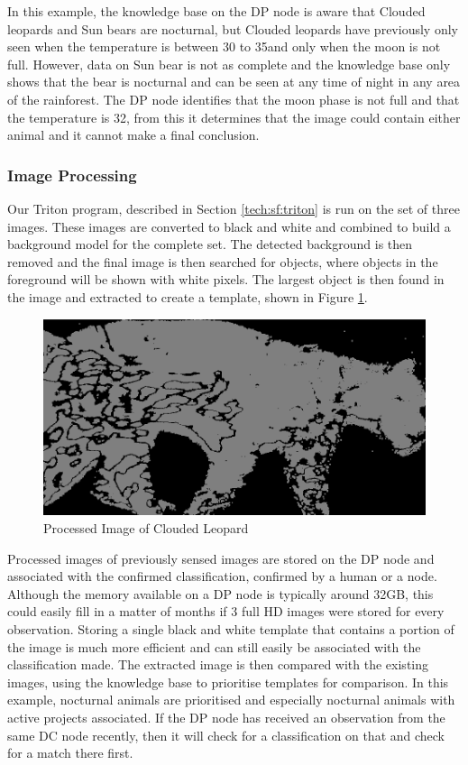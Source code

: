 			In this example, the knowledge base on the DP node is aware that Clouded leopards and Sun bears are nocturnal, but Clouded leopards have previously only seen when the temperature is between 30 to 35\celsius and only when the moon is not full. However, data on Sun bear is not as complete and the knowledge base only shows that the bear is nocturnal and can be seen at any time of night in any area of the rainforest. The DP node identifies that the moon phase is not full and that the temperature is 32\celsius, from this it determines that the image could contain either animal and it cannot make a final conclusion.
			
		\subsubsection{Image Processing}
			Our Triton program, described in Section \ref{tech:sf:triton} is run on the set of three images. These images are converted to black and white and combined to build a background model for the complete set. The detected background is then removed and the final image is then searched for objects, where objects in the foreground will be shown with white pixels. The largest object is then found in the image and extracted to create a template, shown in Figure \ref{clproc}.
			
			\begin{figure}[!t]
			\centering
			\includegraphics[width=\textwidth]{Chap4/figures/leopard_proc}
			\caption{Processed Image of Clouded Leopard}
			\label{clproc}
			\end{figure}
			
			Processed images of previously sensed images are stored on the DP node and associated with the confirmed classification, confirmed by a human or a node. Although the memory available on a DP node is typically around 32GB, this could easily fill in a matter of months if 3 full HD images were stored for every observation. Storing a single black and white template that contains a portion of the image is much more efficient and can still easily be associated with the classification made. The extracted image is then compared with the existing images, using the knowledge base to prioritise templates for comparison. In this example, nocturnal animals are prioritised and especially nocturnal animals with active projects associated. If the DP node has received an observation from the same DC node recently, then it will check for a classification on that and check for a match there first.
			
